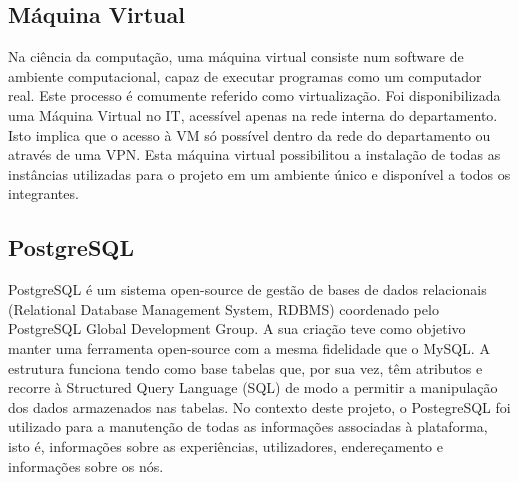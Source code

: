 \subsection{Máquina Virtual}
Na ciência da computação, uma máquina virtual consiste num software de ambiente computacional, capaz de executar programas como um computador real. Este processo é comumente referido como virtualização.\newline
Foi disponibilizada uma Máquina Virtual no IT, acessível apenas na rede interna do departamento. Isto implica que o acesso à VM só possível dentro da rede do departamento ou através de uma VPN. Esta máquina virtual possibilitou a instalação de todas as instâncias utilizadas para o projeto em um ambiente único e disponível a todos os integrantes.


\subsection{PostgreSQL}
PostgreSQL é um sistema open-source de gestão de bases de dados relacionais (Relational Database Management System, RDBMS) coordenado pelo PostgreSQL Global Development Group. A sua criação teve como objetivo manter uma ferramenta open-source com a mesma fidelidade que o MySQL.\newline
A estrutura funciona tendo como base tabelas que, por sua vez, têm atributos e recorre à Structured Query Language (SQL) de modo a permitir a manipulação dos dados armazenados nas tabelas.\newline
No contexto deste projeto, o PostegreSQL foi utilizado para a manutenção de todas as informações associadas à plataforma, isto é, informações sobre as experiências, utilizadores, endereçamento e informações sobre os nós.

